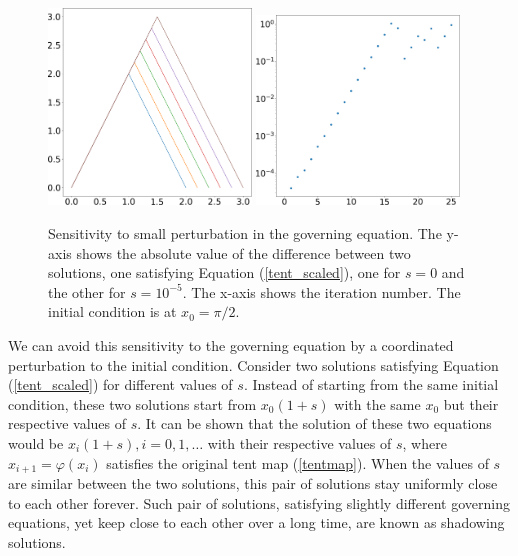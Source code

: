 \begin{figure}[H]   \centering
    \includegraphics[width=0.48\textwidth]{figure/scaled_tent_map.png}
    \hspace{0.02\textwidth}
    \includegraphics[width=0.48\textwidth]{figure/tent_ivp.png}
    \caption{Sensitivity to small perturbation in the governing
    equation.
    The y-axis shows the absolute value of the difference between
    two solutions, one satisfying Equation (\ref{tent_scaled}),
    one for $s=0$ and the other for $s=10^{-5}$.
    The x-axis shows the iteration number.  The initial condition
    is at $x_0=\pi/2$.
    }
    \label{fig:tent_ivp}
\end{figure}

We can avoid this sensitivity to the governing equation
by a coordinated perturbation to the initial condition.
Consider two solutions satisfying Equation (\ref{tent_scaled})
for different values of $s$.  Instead of starting from the same
initial condition, these two solutions start from $x_0 (1 + s)$ with
the same $x_0$ but their respective values of $s$.  It can be shown that
the solution of these two equations would be
$x_i (1+s), i=0,1,\ldots$ with their respective values of $s$,
where $x_{i+1}=\varphi(x_i)$ satisfies the original
tent map (\ref{tentmap}).  When the values of $s$ are similar between
the two solutions, this pair of solutions stay uniformly close to each
other forever.  Such pair of solutions, satisfying slightly different
governing equations, yet keep close to each other over a long time,
are known as shadowing solutions.

